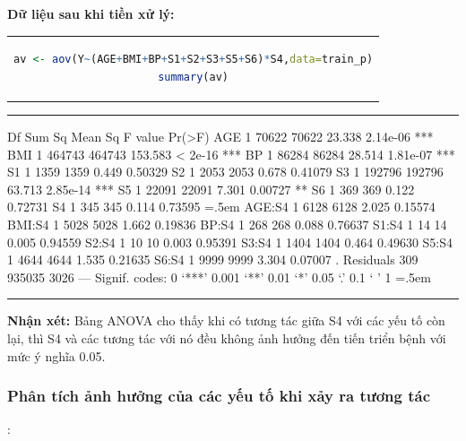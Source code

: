 \documentclass[runningheads]{llncs}
\newenvironment{lcverbatim}
 {\SaveVerbatim{cverb}}
 {\endSaveVerbatim
  \flushleft\fboxrule=0pt\fboxsep=.5em
  \colorbox{cverbbg}{%
    \makebox[\dimexpr\linewidth-2\fboxsep][l]{\BUseVerbatim{cverb}}%
  }
  \endflushleft
}
\begin{document}
\textbf{Dữ liệu sau khi tiền xử lý:}
\begin{center}
\begin{tabular}{c}
\begin{lstlisting}[language=R]
av <- aov(Y~(AGE+BMI+BP+S1+S2+S3+S5+S6)*S4,data=train_p)
summary(av)
\end{lstlisting}
\end{tabular}
\end{center}
\hrule
\begin{lcverbatim}
             Df Sum Sq Mean Sq F value   Pr(>F)    
AGE           1  70622   70622  23.338 2.14e-06 ***
BMI           1 464743  464743 153.583  < 2e-16 ***
BP            1  86284   86284  28.514 1.81e-07 ***
S1            1   1359    1359   0.449  0.50329    
S2            1   2053    2053   0.678  0.41079    
S3            1 192796  192796  63.713 2.85e-14 ***
S5            1  22091   22091   7.301  0.00727 ** 
S6            1    369     369   0.122  0.72731    
S4            1    345     345   0.114  0.73595    
\end{lcverbatim}
\begin{lcverbatim}
AGE:S4        1   6128    6128   2.025  0.15574    
BMI:S4        1   5028    5028   1.662  0.19836    
BP:S4         1    268     268   0.088  0.76637    
S1:S4         1     14      14   0.005  0.94559    
S2:S4         1     10      10   0.003  0.95391    
S3:S4         1   1404    1404   0.464  0.49630    
S5:S4         1   4644    4644   1.535  0.21635    
S6:S4         1   9999    9999   3.304  0.07007 .  
Residuals   309 935035    3026                     
---
Signif. codes:  0 ‘***’ 0.001 ‘**’ 0.01 ‘*’ 0.05 ‘.’ 0.1 ‘ ’ 1
\end{lcverbatim}
\hrule
\vspace{0.5cm}

\textbf{Nhận xét:}
Bảng ANOVA cho thấy khi có tương tác giữa S4 với các yếu tố còn lại, thì S4 và các tương tác với nó đều không ảnh hưởng đến tiến triển bệnh với mức ý nghĩa 0.05.

\subsubsection{Phân tích ảnh hưởng của các yếu tố khi xảy ra tương tác}:
\vspace{0.5cm}
\end{document}
